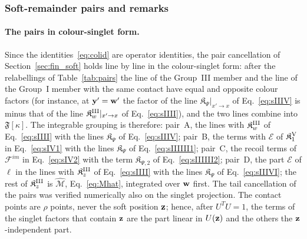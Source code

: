 \subsubsection*{Soft-remainder pairs and remarks}
\paragraph{The pairs in colour-singlet form.} Since the identities~\eqref{eq:colid} are operator identities, the pair cancellation of Section~\ref{sec:fin_soft} holds line by line in the colour-singlet form: after the relabellings of Table~\ref{tab:pairs} the line of the Group~III member and the line of the Group~I member with the same contact have equal and opposite colour factors (for instance, at $\mathbf{y}'=\mathbf{w}'$ the factor of the line $\mathfrak K_\Psi|_{x'\to x}$ of Eq.~\eqref{eq:sIIIV} is minus that of the line $\mathfrak K^{\rm III}_w|_{x'\to x}$ of Eq.~\eqref{eq:sIIII}), and the two lines combine into $\mathfrak F[\kappa]$. The integrable grouping is therefore: pair~A, the lines with $\mathfrak K^{\rm III}_w$ of Eq.~\eqref{eq:sIIII} with the lines $\mathfrak K_\Psi$ of Eq.~\eqref{eq:sIIIV}; pair~B, the terms with $\mathcal E$ of $\mathfrak K^{\rm V}_1$ in Eq.~\eqref{eq:sIV1} with the lines $\mathfrak K_\Psi$ of Eq.~\eqref{eq:sIIIIII1}; pair~C, the recoil terms of $\mathcal F^{im}$ in Eq.~\eqref{eq:sIV2} with the term $\mathfrak K_{\Psi,2}$ of Eq.~\eqref{eq:sIIIIII2}; pair~D, the part $\mathcal E$ of $\ell$ in the lines with $\mathfrak K^{\rm III}_z$ of Eq.~\eqref{eq:sIIII} with the lines $\mathfrak K_\Psi$ of Eq.~\eqref{eq:sIIIVI}; the rest of $\mathfrak K^{\rm III}_z$ is $\widehat{\mathcal M}$, Eq.~\eqref{eq:Mhat}, integrated over $\mathbf{w}$ first. The tail cancellation of the pairs was verified numerically also on the singlet projection. The contact points are $\rho$ points, never the soft position $\mathbf{z}$; hence, after $U^TU=1$, the terms of the singlet factors that contain $\mathbf{z}$ are the part linear in $U(\mathbf{z})$ and the others the $\mathbf{z}$-independent part.

